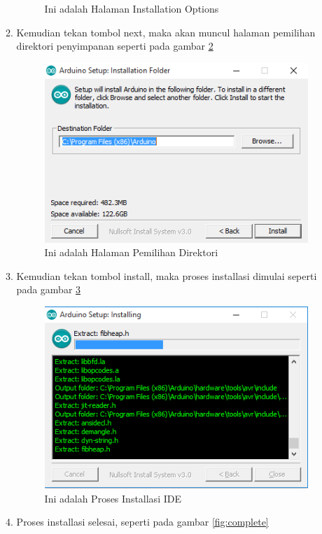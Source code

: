 \begin{enumerate}
\begin{enumerate}
\begin{figure}[!htbp]
            \caption{Ini adalah Halaman Installation Options}\label{fig:option}
            \end{figure}
        \item Kemudian tekan tombol next, maka akan muncul halaman pemilihan direktori penyimpanan seperti pada gambar \ref{fig:dir}
            \begin{figure}[!htbp]
            \centering
            \includegraphics[width=.75\textwidth]{figures/IDE/dir.png}
            \caption{Ini adalah Halaman Pemilihan Direktori}\label{fig:dir}
            \end{figure}
        \item Kemudian tekan tombol install, maka proses installasi dimulai seperti pada gambar \ref{fig:installing}
            \begin{figure}[!htbp]
            \centering
            \includegraphics[width=.75\textwidth]{figures/IDE/installing.png}
            \caption{Ini adalah Proses Installasi IDE}\label{fig:installing}
            \end{figure}
        \item Proses installasi selesai, seperti pada gambar \ref{fig:complete}
            \begin{figure}[!htbp]

\end{figure}
\end{enumerate}
\end{enumerate}

